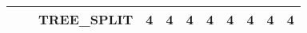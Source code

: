 \begin{table}
\begin{tabular}{lllrrrrrrrr}
 &  & TREE\_SPLIT & {\cellcolor[HTML]{3B4CC0}} \color[HTML]{F1F1F1} 4 & {\cellcolor[HTML]{3B4CC0}} \color[HTML]{F1F1F1} 4 & {\cellcolor[HTML]{3B4CC0}} \color[HTML]{F1F1F1} 4 & {\cellcolor[HTML]{3B4CC0}} \color[HTML]{F1F1F1} 4 & {\cellcolor[HTML]{3B4CC0}} \color[HTML]{F1F1F1} 4 & {\cellcolor[HTML]{3B4CC0}} \color[HTML]{F1F1F1} 4 & {\cellcolor[HTML]{3B4CC0}} \color[HTML]{F1F1F1} 4 & {\cellcolor[HTML]{3B4CC0}} \color[HTML]{F1F1F1} 4 \\
\cline{1-11} \cline{2-11}
\bottomrule
\end{tabular}
\end{table}
